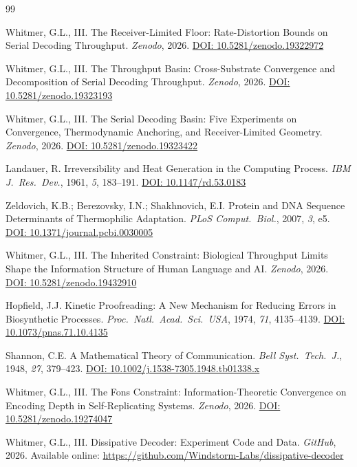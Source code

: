 \documentclass[11pt]{article}
\begin{document}
\begin{thebibliography}{99}

Whitmer, G.L., III.
The Receiver-Limited Floor: Rate-Distortion Bounds on Serial Decoding Throughput.
\emph{Zenodo}, 2026.
\href{https://doi.org/10.5281/zenodo.19322972}{DOI: 10.5281/zenodo.19322972}

Whitmer, G.L., III.
The Throughput Basin: Cross-Substrate Convergence and Decomposition of Serial Decoding Throughput.
\emph{Zenodo}, 2026.
\href{https://doi.org/10.5281/zenodo.19323193}{DOI: 10.5281/zenodo.19323193}

Whitmer, G.L., III.
The Serial Decoding Basin: Five Experiments on Convergence, Thermodynamic Anchoring, and Receiver-Limited Geometry.
\emph{Zenodo}, 2026.
\href{https://doi.org/10.5281/zenodo.19323422}{DOI: 10.5281/zenodo.19323422}

Landauer, R.
Irreversibility and Heat Generation in the Computing Process.
\emph{IBM J.\ Res.\ Dev.}, 1961, \emph{5}, 183--191.
\href{https://doi.org/10.1147/rd.53.0183}{DOI: 10.1147/rd.53.0183}

Zeldovich, K.B.; Berezovsky, I.N.; Shakhnovich, E.I.
Protein and DNA Sequence Determinants of Thermophilic Adaptation.
\emph{PLoS Comput.\ Biol.}, 2007, \emph{3}, e5.
\href{https://doi.org/10.1371/journal.pcbi.0030005}{DOI: 10.1371/journal.pcbi.0030005}

Whitmer, G.L., III.
The Inherited Constraint: Biological Throughput Limits Shape the Information Structure of Human Language and AI.
\emph{Zenodo}, 2026.
\href{https://doi.org/10.5281/zenodo.19432910}{DOI: 10.5281/zenodo.19432910}

Hopfield, J.J.
Kinetic Proofreading: A New Mechanism for Reducing Errors in Biosynthetic Processes.
\emph{Proc.\ Natl.\ Acad.\ Sci.\ USA}, 1974, \emph{71}, 4135--4139.
\href{https://doi.org/10.1073/pnas.71.10.4135}{DOI: 10.1073/pnas.71.10.4135}

Shannon, C.E.
A Mathematical Theory of Communication.
\emph{Bell Syst.\ Tech.\ J.}, 1948, \emph{27}, 379--423.
\href{https://doi.org/10.1002/j.1538-7305.1948.tb01338.x}{DOI: 10.1002/j.1538-7305.1948.tb01338.x}

Whitmer, G.L., III.
The Fons Constraint: Information-Theoretic Convergence on Encoding Depth in Self-Replicating Systems.
\emph{Zenodo}, 2026.
\href{https://doi.org/10.5281/zenodo.19274047}{DOI: 10.5281/zenodo.19274047}

Whitmer, G.L., III.
Dissipative Decoder: Experiment Code and Data.
\emph{GitHub}, 2026.
Available online: \url{https://github.com/Windstorm-Labs/dissipative-decoder}

\end{thebibliography}
\end{document}
